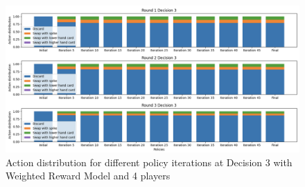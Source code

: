 \documentclass{article}
\begin{document}
    \begin{figure}[H]
    \centering
        \includegraphics[width=\textwidth]{report/figures/4p_d3.png}
        \caption{Action distribution for different policy iterations at Decision 3 with Weighted Reward Model and 4 players}
        \label{fig:4p_dec3_distribution}
    \end{figure}









\end{document}
